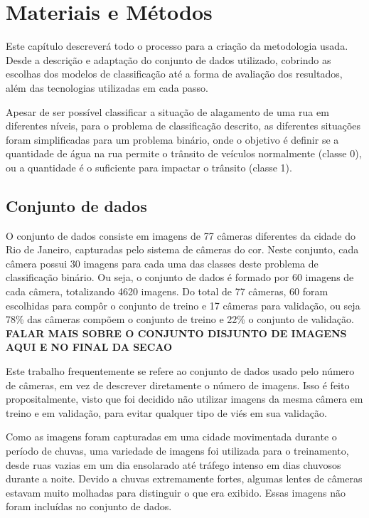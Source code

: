 \chapter{Materiais e Métodos}\label{cap:metodologia}

Este capítulo descreverá todo o processo para a criação da metodologia usada. 
Desde a descrição e adaptação do conjunto de dados utilizado, cobrindo as escolhas dos modelos de classificação até a forma de avaliação dos resultados, 
além das tecnologias utilizadas em cada passo.

Apesar de ser possível classificar a situação de alagamento de uma rua em diferentes níveis, para o problema de classificação descrito, 
as diferentes situações foram simplificadas para um problema binário, onde o objetivo é definir se a quantidade de água na rua permite o trânsito de veículos normalmente (classe 0), 
ou a quantidade é o suficiente para impactar o trânsito (classe 1).

\section{Conjunto de dados}\label{sec:dataset}


O conjunto de dados consiste em imagens de 77 câmeras diferentes da cidade do Rio de Janeiro, capturadas pelo sistema de câmeras do \Acrfull{cor}. 
Neste conjunto, cada câmera possui 30 imagens para cada uma das classes deste problema de classificação binário. 
Ou seja, o conjunto de dados é formado por 60 imagens de cada câmera, totalizando 4620 imagens. 
Do total de 77 câmeras, 60 foram escolhidas para compôr o conjunto de treino e 17 câmeras para validação, ou seja 78\% das câmeras compõem o conjunto de treino e 22\% o conjunto de validação.
\textbf{FALAR MAIS SOBRE O CONJUNTO DISJUNTO DE IMAGENS AQUI E NO FINAL DA SECAO}

Este trabalho frequentemente se refere ao conjunto de dados usado pelo número de câmeras, em vez de descrever diretamente o número de imagens.
Isso é feito propositalmente, visto que foi decidido não utilizar imagens da mesma câmera em treino e em validação, para evitar qualquer tipo de viés em sua validação.

Como as imagens foram capturadas em uma cidade movimentada durante o período de chuvas, uma variedade de imagens foi utilizada para o treinamento, 
desde ruas vazias em um dia ensolarado até tráfego intenso em dias chuvosos durante a noite.
Devido a chuvas extremamente fortes, algumas lentes de câmeras estavam muito molhadas para distinguir o que era exibido. Essas imagens não foram incluídas no conjunto de dados.

